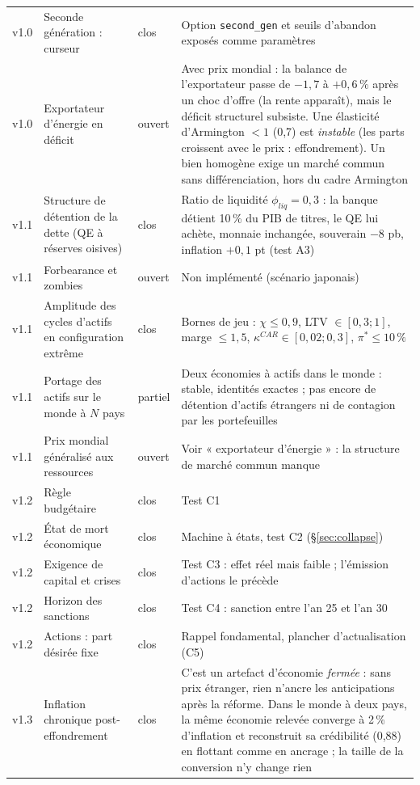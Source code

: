 \documentclass[11pt,a4paper]{article}
\begin{document}
\begin{center}
\begin{longtable}{p{0.9cm}p{4.6cm}p{1.3cm}p{7.6cm}}
v1.0 & Seconde génération : curseur & clos & Option \texttt{second\_gen} et seuils d'abandon exposés comme paramètres\\
v1.0 & Exportateur d'énergie en déficit & ouvert & Avec prix mondial : la balance de l'exportateur passe de $-1{,}7$ à $+0{,}6\,\%$ après un choc d'offre (la rente apparaît), mais le déficit structurel subsiste. Une élasticité d'Armington $<1$ (0,7) est \emph{instable} (les parts croissent avec le prix : effondrement). Un bien homogène exige un marché commun sans différenciation, hors du cadre Armington\\
v1.1 & Structure de détention de la dette (QE à réserves oisives) & clos & Ratio de liquidité $\phi_{liq}=0{,}3$ : la banque détient 10\,\% du PIB de titres, le QE lui achète, monnaie inchangée, souverain $-8$ pb, inflation $+0{,}1$ pt (test A3)\\
v1.1 & Forbearance et zombies & ouvert & Non implémenté (scénario japonais)\\
v1.1 & Amplitude des cycles d'actifs en configuration extrême & clos & Bornes de jeu : $\chi\le0{,}9$, LTV $\in[0{,}3;1]$, marge $\le1{,}5$, $\kappa^{CAR}\in[0{,}02;0{,}3]$, $\pi^\ast\le10\,\%$\\
v1.1 & Portage des actifs sur le monde à $N$ pays & partiel & Deux économies à actifs dans le monde : stable, identités exactes ; pas encore de détention d'actifs étrangers ni de contagion par les portefeuilles\\
v1.1 & Prix mondial généralisé aux ressources & ouvert & Voir « exportateur d'énergie » : la structure de marché commun manque\\
v1.2 & Règle budgétaire & clos & Test C1\\
v1.2 & État de mort économique & clos & Machine à états, test C2 (\S\ref{sec:collapse})\\
v1.2 & Exigence de capital et crises & clos & Test C3 : effet réel mais faible ; l'émission d'actions le précède\\
v1.2 & Horizon des sanctions & clos & Test C4 : sanction entre l'an 25 et l'an 30\\
v1.2 & Actions : part désirée fixe & clos & Rappel fondamental, plancher d'actualisation (C5)\\
v1.3 & Inflation chronique post-effondrement & clos & C'est un artefact d'économie \emph{fermée} : sans prix étranger, rien n'ancre les anticipations après la réforme. Dans le monde à deux pays, la même économie relevée converge à 2\,\% d'inflation et reconstruit sa crédibilité (0,88) en flottant comme en ancrage ; la taille de la conversion n'y change rien\\

\end{longtable}
\end{center}
\end{document}
